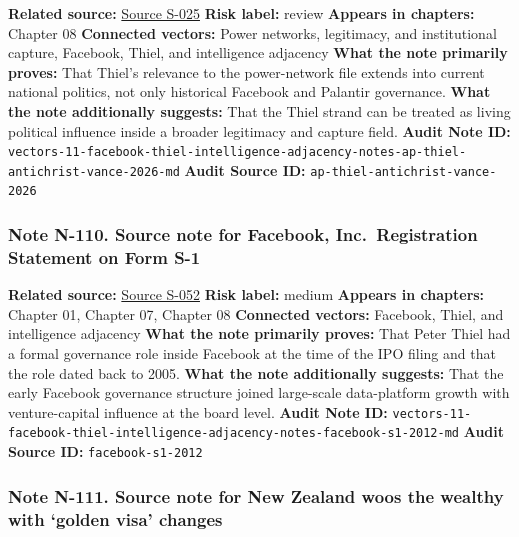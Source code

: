 \documentclass[
  american,
  11pt,
  letterpaper,
]{article}
\begin{document}
\textbf{Related source:}
\hyperref[source-s-025-thiel-brings-his-antichrist-lectures-to-the-vaticans-doorstep-and-catholic-institutions-back-away]{Source
S-025} \textbf{Risk label:} review \textbf{Appears in chapters:} Chapter
08 \textbf{Connected vectors:} Power networks, legitimacy, and
institutional capture, Facebook, Thiel, and intelligence adjacency
\textbf{What the note primarily proves:} That Thiel's relevance to the
power-network file extends into current national politics, not only
historical Facebook and Palantir governance. \textbf{What the note
additionally suggests:} That the Thiel strand can be treated as living
political influence inside a broader legitimacy and capture field.
\textbf{Audit Note ID:}
\texttt{vectors-11-facebook-thiel-intelligence-adjacency-notes-ap-thiel-antichrist-vance-2026-md}
\textbf{Audit Source ID:} \texttt{ap-thiel-antichrist-vance-2026}

\subsubsection{Note N-110. Source note for Facebook, Inc.~Registration
Statement on Form
S-1}\label{note-n-110-vectors-11-facebook-thiel-intelligence-adjacency-notes-facebook-s1-2012-md}

\textbf{Related source:}
\hyperref[source-s-052-facebook-inc-registration-statement-on-form-s-1]{Source
S-052} \textbf{Risk label:} medium \textbf{Appears in chapters:} Chapter
01, Chapter 07, Chapter 08 \textbf{Connected vectors:} Facebook, Thiel,
and intelligence adjacency \textbf{What the note primarily proves:} That
Peter Thiel had a formal governance role inside Facebook at the time of
the IPO filing and that the role dated back to 2005. \textbf{What the
note additionally suggests:} That the early Facebook governance
structure joined large-scale data-platform growth with venture-capital
influence at the board level. \textbf{Audit Note ID:}
\texttt{vectors-11-facebook-thiel-intelligence-adjacency-notes-facebook-s1-2012-md}
\textbf{Audit Source ID:} \texttt{facebook-s1-2012}

\subsubsection{Note N-111. Source note for New Zealand woos the wealthy
with `golden visa'
changes}\label{note-n-111-vectors-11-facebook-thiel-intelligence-adjacency-notes-ft-new-zealand-golden-visa-2025-md}
\end{document}
